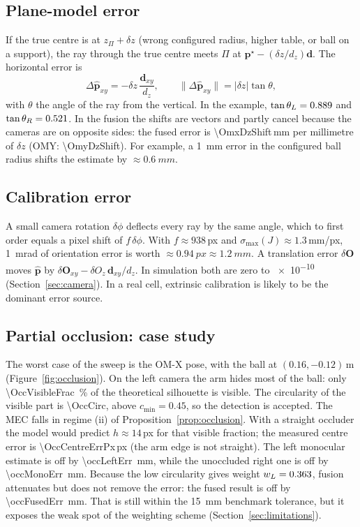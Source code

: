 \documentclass[11pt,a4paper]{article}
\theoremstyle{definition}
\theoremstyle{remark}
\newcommand{\vect}[1]{\bm{#1}}
\newcommand{\code}[1]{\texttt{\detokenize{#1}}}
\begin{document}
\subsection{Plane-model error}

If the true centre is at $z_\Pi+\delta z$ (wrong configured radius, higher
table, or ball on a support), the ray through the true centre meets $\Pi$ at
$\vect p^\star-(\delta z/d_z)\vect d$. The horizontal error is
\begin{equation}
\Delta\hat{\vect p}_{xy}=-\delta z\,\frac{\vect d_{xy}}{d_z},\qquad
\|\Delta\hat{\vect p}_{xy}\|=|\delta z|\tan\theta,
\end{equation}
with $\theta$ the angle of the ray from the vertical. In the example,
$\tan\theta_L=\num{0.889}$ and $\tan\theta_R=\num{0.521}$.
In the fusion the shifts are vectors and partly cancel because the cameras are
on opposite sides: the fused error is \num{\OmxDzShift}\,mm per millimetre of
$\delta z$ (OMY: \num{\OmyDzShift}). For example, a \SI{1}{mm} error in the
configured ball radius shifts the estimate by $\approx\SI{0.6}{mm}$.

\subsection{Calibration error}

A small camera rotation $\delta\phi$ deflects every ray by the same angle,
which to first order equals a pixel shift of $f\,\delta\phi$. With
$f\approx938$\,px and $\sigma_{\max}(J)\approx1.3$\,mm/px, \SI{1}{mrad} of
orientation error is worth $\approx\SI{0.94}{px}\approx\SI{1.2}{mm}$. A
translation error $\delta\vect O$ moves $\hat{\vect p}$ by
$\delta\vect O_{xy}-\delta O_z\,\vect d_{xy}/d_z$. In simulation both are zero
to \num{e-10} (Section~\ref{sec:camera}). In a real cell, extrinsic
calibration is likely to be the dominant error source.

\subsection{Partial occlusion: case study}
\label{sec:occlusion-case}

The worst case of the sweep is the OM-X \code{mid_backish} pose, with the
ball at $(0.16, -0.12)$\,m (Figure~\ref{fig:occlusion}). On the left camera the
arm hides most of the ball: only \SI{\OccVisibleFrac}{\percent} of the
theoretical silhouette is visible. The circularity of the visible part is
\num{\OccCirc}, above $c_{\min}=0.45$, so the detection is accepted. The MEC
falls in regime (ii) of Proposition~\ref{prop:occlusion}. With a straight
occluder the model would predict $h\approx14$\,px for that visible fraction;
the measured centre error is \num{\OccCentreErrPx}\,px (the arm edge is not
straight). The left monocular estimate is off by \SI{\occLeftErr}{mm}, while
the unoccluded right one is off by \SI{\occMonoErr}{mm}. Because the low
circularity gives weight $w_L=\num{0.363}$, fusion attenuates but does not
remove the error: the fused result is off by \SI{\occFusedErr}{mm}. That is
still within the \SI{15}{mm} benchmark tolerance, but it exposes the weak spot
of the weighting scheme (Section~\ref{sec:limitations}).
\end{document}
